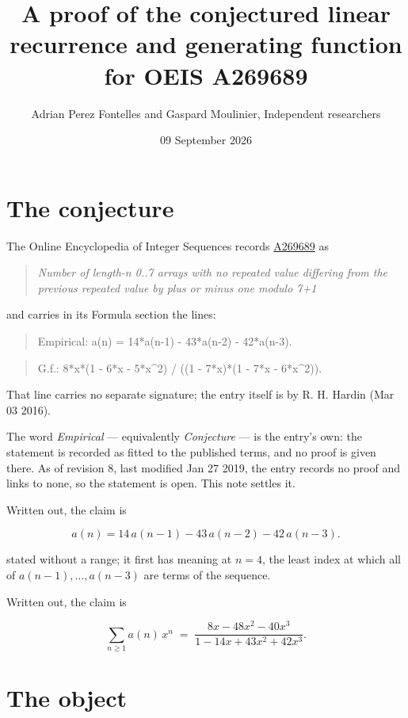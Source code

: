 \documentclass[11pt]{article}
\title{A proof of the conjectured linear recurrence and generating function for OEIS A269689}
\author{Adrian Perez Fontelles and Gaspard Moulinier, Independent researchers}
\date{09 September 2026}
\theoremstyle{definition}
\begin{document}
\maketitle
\section{The conjecture}

The Online Encyclopedia of Integer Sequences records \href{https://oeis.org/A269689}{A269689} as

\begin{quote}\itshape Number of length-n 0..7 arrays with no repeated value differing from the previous repeated value by plus or minus one modulo 7+1\end{quote}

and carries in its Formula section the lines:

\begin{quote}\ttfamily Empirical: a(n) = 14*a(n-1) - 43*a(n-2) - 42*a(n-3).\end{quote}

\begin{quote}\ttfamily G.f.: 8*x*(1 - 6*x - 5*x\textasciicircum{}2) / ((1 - 7*x)*(1 - 7*x - 6*x\textasciicircum{}2)).\end{quote}

That line carries no separate signature; the entry itself is by R. H. Hardin (Mar 03 2016).

The word {\itshape Empirical} --- equivalently {\itshape Conjecture} --- is the entry's own: the statement is recorded as fitted to the published terms, and no proof is given there. As of revision 8, last modified Jan 27 2019, the entry records no proof and links to none, so the statement is open. This note settles it.

Written out, the claim is

\[a(n) = 14\,a(n-1) - 43\,a(n-2) - 42\,a(n-3).\]

stated without a range; it first has meaning at $n = 4$, the least index at which all of $a(n-1),\dots,a(n-3)$ are terms of the sequence.

Written out, the claim is

\[\sum_{n \ge 1} a(n)\,x^n \;=\; \frac{8x - 48x^{2} - 40x^{3}}{1 - 14x + 43x^{2} + 42x^{3}}.\]

\section{The object}
\end{document}
